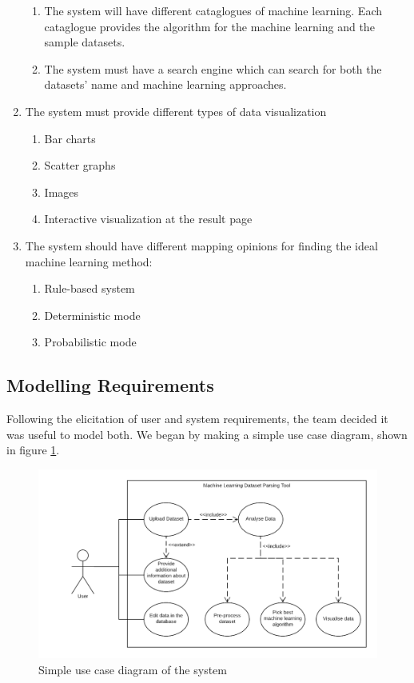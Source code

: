 \documentclass[titlepage]{article}
\begin{document}
\begin{enumerate}
\begin{enumerate}
    \item The system will have different cataglogues of machine learning. Each cataglogue provides the algorithm for the machine learning and the sample datasets.
    
    \item The system must have a search engine which can search for both the datasets' name and machine learning approaches.
  \end{enumerate}
  
  \item The system must provide different types of data visualization
  \begin{enumerate}
    \item Bar charts
    \item Scatter graphs
    \item Images 
    \item Interactive visualization at the result page
  \end{enumerate}
  
  \item The system should have different mapping opinions for finding the ideal machine learning method:
  \begin{enumerate}
    \item Rule-based system
    \item Deterministic mode
    \item Probabilistic mode
  \end{enumerate} 
\end{enumerate}

\subsection{Modelling Requirements}
Following the elicitation of user and system requirements, the team decided it was useful to model both. We began by making a simple use case diagram, shown in figure \ref{usecase}.

\begin{figure}[h!]
  \centering
  \includegraphics[width=\textwidth]{usecase}
  \caption{Simple use case diagram of the system}
  \label{usecase}
\end{figure}
\end{document}
